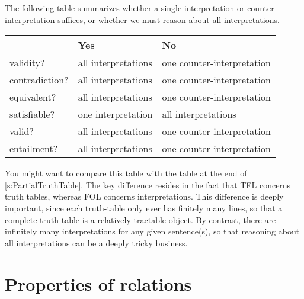 The following table summarizes whether a single interpretation or counter-interpretation suffices, or whether we must reason about all interpretations.

\begin{center}\small
\begin{tabular}{l l l}
 & \textbf{Yes} & \textbf{No}\\
 \hline
validity? & all interpretations & one counter-interpretation\\
contradiction? &  all interpretations  & one counter-interpretation\\
equivalent? & all interpretations & one counter-interpretation\\
satisfiable? & one interpretation & all interpretations\\
valid? & all interpretations & one counter-interpretation\\
entailment? & all interpretations & one counter-interpretation\\
\end{tabular}
\end{center}
\label{table.ModelOrArgument}

You might want to compare this table with the table at the end of \cref{s:PartialTruthTable}. The key difference resides in the fact that TFL concerns truth tables, whereas FOL concerns interpretations. This difference is deeply important, since each truth-table only ever has finitely many lines, so that a complete truth table is a relatively tractable object. By contrast, there are infinitely many interpretations for any given sentence(s), so that reasoning about all interpretations can be a deeply tricky business.

\chapter{Properties of relations}\label{ch:PropRelations}

